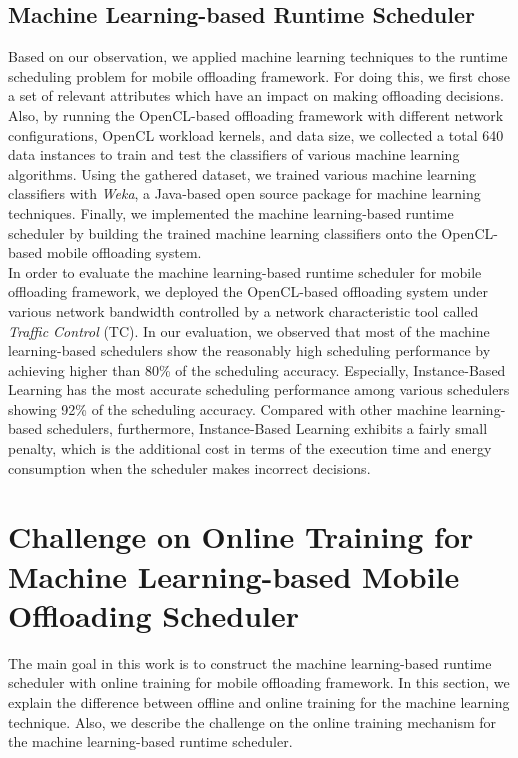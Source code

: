 \documentclass[10pt, conference, compsocconf]{IEEEtran}
\begin{document}
\subsection{Machine Learning-based Runtime Scheduler}
%
Based on our observation, we applied machine learning techniques to the
runtime scheduling problem for mobile offloading framework.
%
For doing this, we first chose a set of relevant attributes which have
an impact on making offloading decisions.
%
Also, by running the OpenCL-based offloading framework with different
network configurations, OpenCL workload kernels, and data size, we
collected a total 640 data instances to train and test the classifiers
of various machine learning algorithms.
%
Using the gathered dataset, we trained various machine learning
classifiers with \textit{Weka}, a Java-based open source package for
machine learning techniques.
%
Finally, we implemented the machine learning-based runtime scheduler by
building the trained machine learning classifiers onto the
OpenCL-based mobile offloading system.\\
%
\indent In order to evaluate the machine learning-based runtime
scheduler for mobile offloading framework, we deployed the OpenCL-based
offloading system under various network bandwidth controlled by a
network characteristic tool called \textit{Traffic Control} (TC).
%
In our evaluation, we observed that most of the machine learning-based
schedulers show the reasonably high scheduling performance by achieving
higher than 80\% of the scheduling accuracy.
%
Especially, Instance-Based Learning has the most accurate scheduling
performance among various schedulers showing 92\% of the scheduling
accuracy.
%
Compared with other machine learning-based schedulers, furthermore,
Instance-Based Learning exhibits a fairly small penalty, which is the
additional cost in terms of the execution time and energy consumption
when the scheduler makes incorrect decisions.
%
\section{Challenge on Online Training for Machine Learning-based Mobile
Offloading Scheduler}
%
The main goal in this work is to construct the machine learning-based
runtime scheduler with online training for mobile offloading framework.
%
In this section, we explain the difference between offline and online
training for the machine learning technique.
%
Also, we describe the challenge on the online training mechanism for the
machine learning-based runtime scheduler.
%
\end{document}

